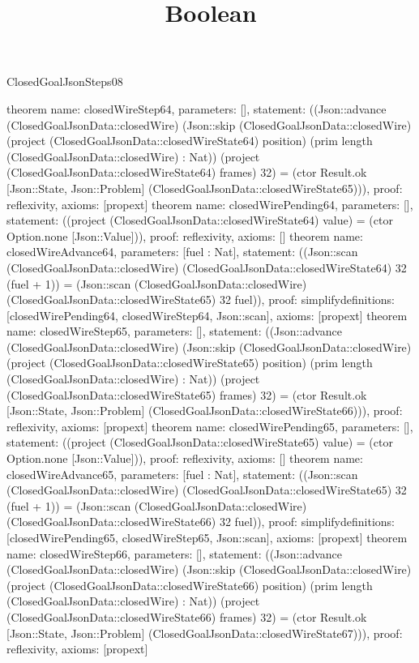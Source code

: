 \begin{lexlean}{ClosedGoalJsonSteps08}
\title{Boolean}
\begin{semanticmodule}
theorem{
 name: closedWireStep64, parameters: [],
 statement: ((Json::advance (ClosedGoalJsonData::closedWire) (Json::skip (ClosedGoalJsonData::closedWire) (project (ClosedGoalJsonData::closedWireState64) position) (prim length (ClosedGoalJsonData::closedWire) : Nat)) (project (ClosedGoalJsonData::closedWireState64) frames) 32) = (ctor Result.ok [Json::State, Json::Problem] (ClosedGoalJsonData::closedWireState65))), proof: reflexivity{}, axioms: [propext]
}
theorem{
 name: closedWirePending64, parameters: [],
 statement: ((project (ClosedGoalJsonData::closedWireState64) value) = (ctor Option.none [Json::Value])), proof: reflexivity{}, axioms: []
}
theorem{
 name: closedWireAdvance64, parameters: [fuel : Nat],
 statement: ((Json::scan (ClosedGoalJsonData::closedWire) (ClosedGoalJsonData::closedWireState64) 32 (fuel + 1)) = (Json::scan (ClosedGoalJsonData::closedWire) (ClosedGoalJsonData::closedWireState65) 32 fuel)), proof: simplify{definitions: [closedWirePending64, closedWireStep64, Json::scan]}, axioms: [propext]
}
theorem{
 name: closedWireStep65, parameters: [],
 statement: ((Json::advance (ClosedGoalJsonData::closedWire) (Json::skip (ClosedGoalJsonData::closedWire) (project (ClosedGoalJsonData::closedWireState65) position) (prim length (ClosedGoalJsonData::closedWire) : Nat)) (project (ClosedGoalJsonData::closedWireState65) frames) 32) = (ctor Result.ok [Json::State, Json::Problem] (ClosedGoalJsonData::closedWireState66))), proof: reflexivity{}, axioms: [propext]
}
theorem{
 name: closedWirePending65, parameters: [],
 statement: ((project (ClosedGoalJsonData::closedWireState65) value) = (ctor Option.none [Json::Value])), proof: reflexivity{}, axioms: []
}
theorem{
 name: closedWireAdvance65, parameters: [fuel : Nat],
 statement: ((Json::scan (ClosedGoalJsonData::closedWire) (ClosedGoalJsonData::closedWireState65) 32 (fuel + 1)) = (Json::scan (ClosedGoalJsonData::closedWire) (ClosedGoalJsonData::closedWireState66) 32 fuel)), proof: simplify{definitions: [closedWirePending65, closedWireStep65, Json::scan]}, axioms: [propext]
}
theorem{
 name: closedWireStep66, parameters: [],
 statement: ((Json::advance (ClosedGoalJsonData::closedWire) (Json::skip (ClosedGoalJsonData::closedWire) (project (ClosedGoalJsonData::closedWireState66) position) (prim length (ClosedGoalJsonData::closedWire) : Nat)) (project (ClosedGoalJsonData::closedWireState66) frames) 32) = (ctor Result.ok [Json::State, Json::Problem] (ClosedGoalJsonData::closedWireState67))), proof: reflexivity{}, axioms: [propext]
}
\end{semanticmodule}
\end{lexlean}
